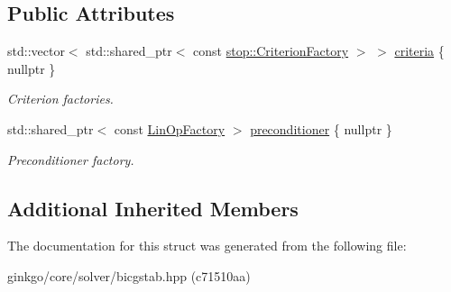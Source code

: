 \subsection*{Public Attributes}
\begin{DoxyCompactItemize}
\item 
\mbox{\label{structgko_1_1solver_1_1Bicgstab_1_1parameters__type_a98e25950c6dcaa68eacc241fbc8bd521}} 
std\+::vector$<$ std\+::shared\+\_\+ptr$<$ const \hyperlink{namespacegko_1_1stop_ab12a51109c50b35ec36dc5a393d6a9a0}{stop\+::\+Criterion\+Factory} $>$ $>$ \hyperlink{structgko_1_1solver_1_1Bicgstab_1_1parameters__type_a98e25950c6dcaa68eacc241fbc8bd521}{criteria} \{ nullptr \}
\begin{DoxyCompactList}\small\item\em Criterion factories. \end{DoxyCompactList}\item 
\mbox{\label{structgko_1_1solver_1_1Bicgstab_1_1parameters__type_a758bdb82889e200ff6800e34e9a2d5c4}} 
std\+::shared\+\_\+ptr$<$ const \hyperlink{classgko_1_1LinOpFactory}{Lin\+Op\+Factory} $>$ \hyperlink{structgko_1_1solver_1_1Bicgstab_1_1parameters__type_a758bdb82889e200ff6800e34e9a2d5c4}{preconditioner} \{ nullptr \}
\begin{DoxyCompactList}\small\item\em Preconditioner factory. \end{DoxyCompactList}\end{DoxyCompactItemize}
\subsection*{Additional Inherited Members}


The documentation for this struct was generated from the following file\+:\begin{DoxyCompactItemize}
\item 
ginkgo/core/solver/bicgstab.\+hpp (c71510aa)\end{DoxyCompactItemize}
